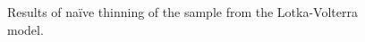 \documentclass[11pt,a4paper]{report}
\begin{document}
\begin{figure}[h]
\centering
{}
\caption{Results of na\"ive thinning of the sample from the Lotka-Volterra model.
\label{fig:lotka-volterra:naive:results}}
\end{figure}
\end{document}

